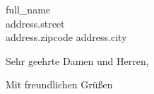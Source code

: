 \documentclass[
    11pt,
    a4paper,
    letter,
    parskip=yes,
    ]{scrlttr2}
\date{\today}
\begin{document}
\begin{letter}{
{{full_name}}\\
{{address.street}}\\
{{address.zipcode}} {{address.city}}}

\opening{Sehr geehrte Damen und Herren,}

\closing{Mit freundlichen Grüßen}
\end{letter}
\end{document}

